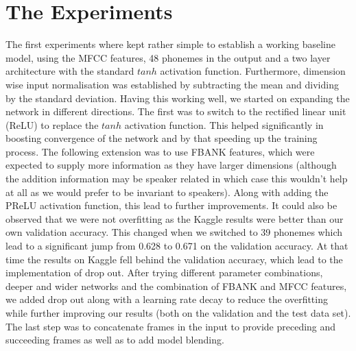 \documentclass[]{article}
\begin{document}
\section{The Experiments}
The first experiments where kept rather simple to establish a working baseline model, using the MFCC features, 48 phonemes in the output and a two layer architecture with the standard $tanh$ activation function. Furthermore, dimension wise input normalisation was established by subtracting the mean and dividing by the standard deviation. Having this working well, we started on expanding the network in different directions. The first was to switch to the rectified linear unit (ReLU) to replace the $tanh$ activation function. This helped significantly in boosting convergence of the network and by that speeding up the training process. The following extension was to use FBANK features, which were expected to supply more information as they have larger dimensions (although the addition information may be speaker related in which case this wouldn't help at all as we would prefer to be invariant to speakers). Along with adding the PReLU activation function, this lead to further improvements. It could also be observed that we were not overfitting as the Kaggle results were better than our own validation accuracy. This changed when we switched to 39 phonemes which lead to a significant jump from 0.628 to 0.671 on the validation accuracy. At that time the results on Kaggle fell behind the validation accuracy, which lead to the implementation of drop out. After trying different parameter combinations, deeper and wider networks and the combination of FBANK and MFCC features, we added drop out along with a learning rate decay to reduce the overfitting while further improving our results (both on the validation and the test data set). The last step was to concatenate frames in the input to provide preceding and succeeding frames as well as to add model blending.
\end{document}

